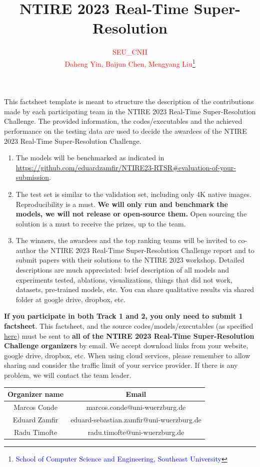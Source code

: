 \documentclass{article}
\title{NTIRE 2023 Real-Time Super-Resolution}
\author{\textcolor{red}{SEU\_CNII}\\
\textcolor{red}{Daheng Yin, Baijun Chen, Mengyang Liu}\thanks{\textcolor{blue}{School of Computer Science and Engineering, Southeast University}}\\
}
\begin{document}
\maketitle

This factsheet template is meant to structure the description of the contributions made by each participating team in the NTIRE 2023 Real-Time Super-Resolution Challenge.
%
The provided information, the codes/executables and the achieved performance on the testing data are used to decide the awardees of the NTIRE 2023 Real-Time Super-Resolution Challenge. 

\begin{enumerate}
    \item The models will be benchmarked as indicated in \url{https://github.com/eduardzamfir/NTIRE23-RTSR#evaluation-of-your-submission}.
    \item The test set is similar to the validation set, including only 4K native images. Reproducibility is a must. \textbf{We will only run and benchmark the models, we will not release or open-source them.} Open sourcing the solution is a must to receive the prizes, up to the team.
    \item The winners, the awardees and the top ranking teams will be invited to co-author the NTIRE 2023 Real-Time Super-Resolution Challenge report and to submit papers with their solutions to the NTIRE 2023 workshop. Detailed descriptions are much appreciated: brief description of all models and experiments tested, ablations, visualizations, things that did not work, datasets, pre-trained models, etc. You can share qualitative results via shared folder at google drive, dropbox, etc.
\end{enumerate}

\textbf{If you participate in both Track 1 and 2, you only need to submit 1 factsheet}.
This factsheet, and the source codes/models/executables (as specified \href{https://github.com/eduardzamfir/NTIRE23-RTSR#evaluation-of-your-submission}{here}) must be sent to \textbf{all of the NTIRE 2023 Real-Time Super-Resolution Challenge organizers} by email. We accept download links from your website, google drive, dropbox, etc. When using cloud services, please remember to allow sharing and consider the traffic limit of your service provider. If there is any problem, we will contact the team leader.

\begin{table}[h]
\begin{center}
\begin{tabular}{|c|c|}
    \hline
    Organizer name & Email \\
    \hline
    Marcos Conde  & marcos.conde@uni-wuerzburg.de  \\
    Eduard Zamfir & eduard-sebastian.zamfir@uni-wuerzburg.de  \\
    Radu Timofte  & radu.timofte@uni-wuerzburg.de \\
    \hline
\end{tabular}
\vspace{-0.5cm}
\end{center}
\end{table}
 \newpage
\end{document}

